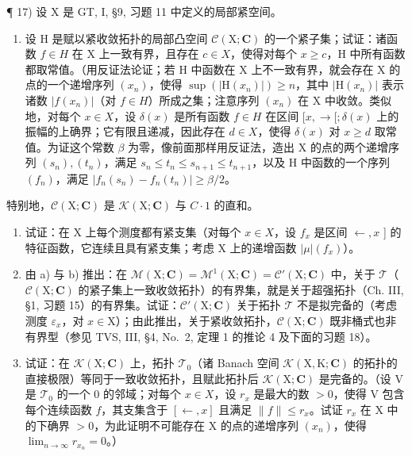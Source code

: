 ¶ 17) 设 X 是 GT, I, §9, 习题 11 中定义的局部紧空间。

\begin{enumerate}
\def\labelenumi{\alph{enumi})}
\tightlist
\item
  设 H 是赋以紧收敛拓扑的局部凸空间 \(\mathcal{C}(\mathrm{X};\mathbf{C})\) 的一个紧子集；试证：诸函数 \(f \in H\) 在 X 上一致有界，且存在 \(c \in X\)，使得对每个 \(x \geqslant c\)，H 中所有函数都取常值。（用反证法论证；若 H 中函数在 X 上不一致有界，就会存在 X 的点的一个递增序列 \((x_{n})\)，使得 \(\sup(|\mathrm{H}(x_{n})|) \geqslant n\)，其中 \(|\mathrm{H}(x_{n})|\) 表示诸数 \(|f(x_{n})|\)（对 \(f \in H\)）所成之集；注意序列 \((x_{n})\) 在 X 中收敛。类似地，对每个 \(x \in X\)，设 \(\delta(x)\) 是所有函数 \(f \in H\) 在区间 \([x, \rightarrow[; \delta(x)\) 上的振幅的上确界；它有限且递减，因此存在 \(d \in X\)，使得 \(\delta(x)\) 对 \(x \geqslant d\) 取常值。为证这个常数 \(\beta\) 为零，像前面那样用反证法，造出 X 的点的两个递增序列 \((s_{n}), (t_{n})\)，满足 \(s_{n} \leqslant t_{n} \leqslant s_{n+1} \leqslant t_{n+1}\)，以及 H 中函数的一个序列 \((f_{n})\)，满足 \(|f_{n}(s_{n}) - f_{n}(t_{n})| \geqslant \beta/2\)。
\end{enumerate}

特别地，\(\mathcal{C}(\mathrm{X};\mathbf{C})\) 是 \(\mathcal{K}(\mathrm{X};\mathbf{C})\) 与 \(C\cdot1\) 的直和。

\begin{enumerate}
\def\labelenumi{\alph{enumi})}
\setcounter{enumi}{1}
\item
  试证：在 X 上每个测度都有紧支集（对每个 \(x \in X\)，设 \(f_x\) 是区间 \(\leftarrow, x\) {]} 的特征函数，它连续且具有紧支集；考虑 X 上的递增函数 \(|\mu|(f_x)\)）。
\item
  由 a) 与 b) 推出：在 \(\mathcal{M}(\mathrm{X};\mathbf{C}) = \mathcal{M}^{1}(\mathrm{X};\mathbf{C}) = \mathcal{C}'(\mathrm{X};\mathbf{C})\) 中，关于 \(\mathcal{T}\)（\(\mathcal{C}(\mathrm{X};\mathbf{C})\) 的紧子集上一致收敛拓扑）的有界集，就是关于超强拓扑（Ch. III, §1, 习题 15）的有界集。试证：\(\mathcal{C}'(\mathrm{X};\mathbf{C})\) 关于拓扑 \(\mathcal{T}\) 不是拟完备的（考虑测度 \(\varepsilon_{x}\)，对 \(x\in \mathrm{X}\)）；由此推出，关于紧收敛拓扑，\(\mathcal{C}(\mathrm{X};\mathbf{C})\) 既非桶式也非有界型（参见 TVS, III, §4, No.~2, 定理 1 的推论 4 及下面的习题 18）。
\item
  试证：在 \(\mathcal{K}(\mathrm{X};\mathbf{C})\) 上，拓扑 \(\mathcal{T}_0\)（诸 Banach 空间 \(\mathcal{K}(\mathrm{X},\mathrm{K};\mathbf{C})\) 的拓扑的直接极限）等同于一致收敛拓扑，且赋此拓扑后 \(\mathcal{K}(\mathrm{X};\mathbf{C})\) 是完备的。（设 V 是 \(\mathcal{T}_0\) 的一个 0 的邻域；对每个 \(x\in X\)，设 \(r_x\) 是最大的数 \(>0\)，使得 V 包含每个连续函数 \(f\)，其支集含于 \([ \leftarrow ,x]\) 且满足 \(\| f\| \leqslant r_x\)。试证 \(r_x\) 在 X 中的下确界 \(>0\)，为此证明不可能存在 X 的点的递增序列 \((x_n)\)，使得 \(\lim_{n\to \infty}r_{x_n} = 0\)。）
\end{enumerate}

